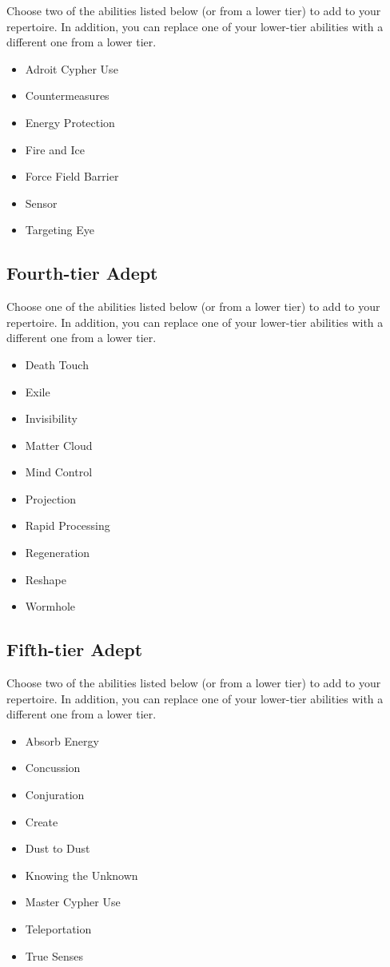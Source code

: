 Choose two of the abilities listed below (or from a lower tier) to add to your repertoire. In addition, you can replace one of your lower-tier abilities with a different one from a lower tier.

\begin{itemize}
\item Adroit Cypher Use
\item Countermeasures
\item Energy Protection
\item Fire and Ice
\item Force Field Barrier
\item Sensor
\item Targeting Eye
\end{itemize}

\subsection{Fourth-tier Adept}

Choose one of the abilities listed below (or from a lower tier) to add to your repertoire. In addition, you can replace one of your lower-tier abilities with a different one from a lower tier.

\begin{itemize}
\item Death Touch
\item Exile
\item Invisibility
\item Matter Cloud
\item Mind Control
\item Projection
\item Rapid Processing 
\item Regeneration
\item Reshape
\item Wormhole
\end{itemize}

\subsection{Fifth-tier Adept}

Choose two of the abilities listed below (or from a lower tier) to add to your repertoire. In addition, you can replace one of your lower-tier abilities with a different one from a lower tier.

\begin{itemize}
\item Absorb Energy
\item Concussion
\item Conjuration
\item Create
\item Dust to Dust 
\item Knowing the Unknown
\item Master Cypher Use
\item Teleportation
\item True Senses
\end{itemize}

